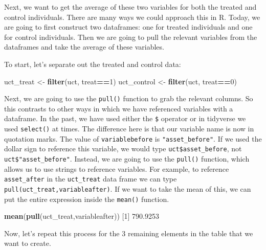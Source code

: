 \documentclass[
]{book}
\newenvironment{Shaded}{\begin{snugshade}}{\end{snugshade}}
\newcommand{\DecValTok}[1]{\textcolor[rgb]{0.00,0.00,0.81}{#1}}
\newcommand{\FloatTok}[1]{\textcolor[rgb]{0.00,0.00,0.81}{#1}}
\newcommand{\FunctionTok}[1]{\textcolor[rgb]{0.13,0.29,0.53}{\textbf{#1}}}
\newcommand{\NormalTok}[1]{#1}
\newcommand{\OtherTok}[1]{\textcolor[rgb]{0.56,0.35,0.01}{#1}}
\newcommand{\SpecialCharTok}[1]{\textcolor[rgb]{0.81,0.36,0.00}{\textbf{#1}}}
\begin{document}
Next, we want to get the average of these two variables for both the treated and control individuals. There are many ways we could approach this in R. Today, we are going to first construct two dataframes: one for treated individuals and one for control individuals. Then we are going to pull the relevant variables from the dataframes and take the average of these variables.

To start, let's separate out the treated and control data:

\begin{Shaded}
\begin{Highlighting}[]
\NormalTok{uct\_treat }\OtherTok{\textless{}{-}} \FunctionTok{filter}\NormalTok{(uct, treat}\SpecialCharTok{==}\DecValTok{1}\NormalTok{)}
\NormalTok{uct\_control }\OtherTok{\textless{}{-}} \FunctionTok{filter}\NormalTok{(uct, treat}\SpecialCharTok{==}\DecValTok{0}\NormalTok{)}
\end{Highlighting}
\end{Shaded}

Next, we are going to use the \texttt{pull()} function to grab the relevant columns. So this contrasts to other ways in which we have referenced variables with a dataframe. In the past, we have used either the \texttt{\$} operator or in tidyverse we used \texttt{select()} at times. The difference here is that our variable name is now in quotation marks. The value of \texttt{variablebefore} is \texttt{"asset\_before"}. If we used the dollar sign to reference this variable, we would type \texttt{uct\$asset\_before}, not \texttt{uct\$"asset\_before"}. Instead, we are going to use the \texttt{pull()} function, which allows us to use strings to reference variables. For example, to reference \texttt{asset\_after} in the \texttt{uct\_treat} data frame we can type \texttt{pull(uct\_treat,variableafter)}. If we want to take the mean of this, we can put the entire expression inside the \texttt{mean()} function.

\begin{Shaded}
\begin{Highlighting}[]
\FunctionTok{mean}\NormalTok{(}\FunctionTok{pull}\NormalTok{(uct\_treat,variableafter))}
\NormalTok{[}\DecValTok{1}\NormalTok{] }\FloatTok{790.9253}
\end{Highlighting}
\end{Shaded}

Now, let's repeat this process for the 3 remaining elements in the table that we want to create.
\end{document}
